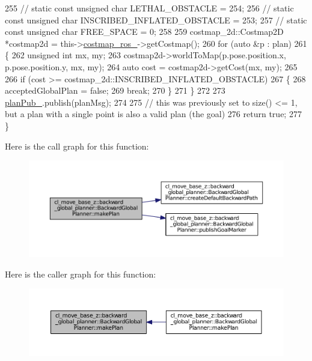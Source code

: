 \begin{DoxyCode}
255     \textcolor{comment}{// static const unsigned char LETHAL\_OBSTACLE = 254;}
256     \textcolor{comment}{// static const unsigned char INSCRIBED\_INFLATED\_OBSTACLE = 253;}
257     \textcolor{comment}{// static const unsigned char FREE\_SPACE = 0;}
258 
259     costmap\_2d::Costmap2D *costmap2d = this->\hyperlink{classcl__move__base__z_1_1backward__global__planner_1_1BackwardGlobalPlanner_a7103c15e6540a514acd421c3c6e194a4}{costmap\_ros\_}->getCostmap();
260     \textcolor{keywordflow}{for} (\textcolor{keyword}{auto} &p : plan)
261     \{
262         \textcolor{keywordtype}{unsigned} \textcolor{keywordtype}{int} mx, my;
263         costmap2d->worldToMap(p.pose.position.x, p.pose.position.y, mx, my);
264         \textcolor{keyword}{auto} cost = costmap2d->getCost(mx, my);
265 
266         \textcolor{keywordflow}{if} (cost >= costmap\_2d::INSCRIBED\_INFLATED\_OBSTACLE)
267         \{
268             acceptedGlobalPlan = \textcolor{keyword}{false};
269             \textcolor{keywordflow}{break};
270         \}
271     \}
272     
273     \hyperlink{classcl__move__base__z_1_1backward__global__planner_1_1BackwardGlobalPlanner_a561eab039140948c52ec928c191f3f43}{planPub\_}.publish(planMsg);
274 
275     \textcolor{comment}{// this was previously set to size() <= 1, but a plan with a single point is also a valid plan (the
       goal)}
276     \textcolor{keywordflow}{return} \textcolor{keyword}{true};
277 \}
\end{DoxyCode}


Here is the call graph for this function\+:
\nopagebreak
\begin{figure}[H]
\begin{center}
\leavevmode
\includegraphics[width=350pt]{classcl__move__base__z_1_1backward__global__planner_1_1BackwardGlobalPlanner_a3f1f3c81e7c52c9305544fd793741a41_cgraph}
\end{center}
\end{figure}




Here is the caller graph for this function\+:
\nopagebreak
\begin{figure}[H]
\begin{center}
\leavevmode
\includegraphics[width=350pt]{classcl__move__base__z_1_1backward__global__planner_1_1BackwardGlobalPlanner_a3f1f3c81e7c52c9305544fd793741a41_icgraph}
\end{center}
\end{figure}


